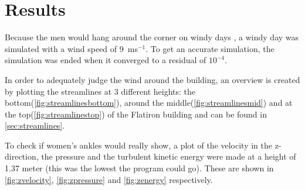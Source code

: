 \section{Results}
\label{sec:results}
Because the men would hang around the corner on windy days \cite{dresses}, a windy day was simulated with a wind speed of 9~ms$^{-1}$. To get an accurate simulation, the simulation was ended when it converged to a residual of $10^{-4}$. 

In order to adequately judge the wind around the building, an overview is created by plotting the streamlines at 3 different heights: the bottom(\autoref{fig:streamlinesbottom}), around the middle(\autoref{fig:streamlinesmid}) and at the top(\autoref{fig:streamlinestop}) of the Flatiron building and can be found in \autoref{sec:streamlines}.

To check if women's ankles would really show, a plot of the velocity in the z-direction, the pressure and the turbulent kinetic energy were made at a height of 1.37 meter (this was the lowest the program could go). These are shown in \autoref{fig:zvelocity}, \ref{fig:zpressure} and \ref{fig:zenergy} respectively.

